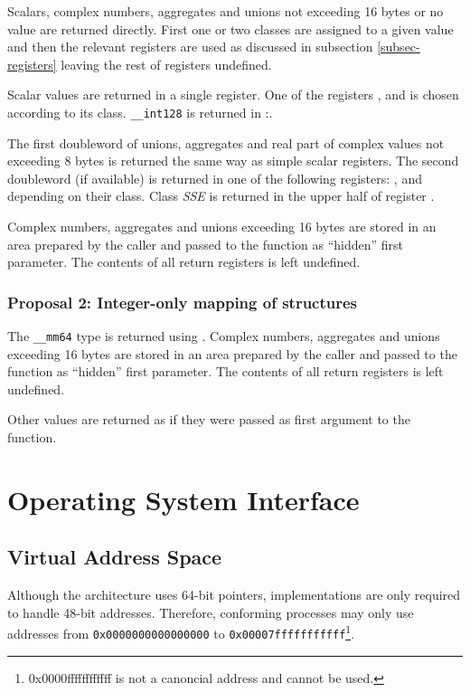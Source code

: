 Scalars, complex numbers, aggregates and unions not exceeding 16 bytes
or no value are returned directly.  First one or two classes are
assigned to a given value and then the relevant registers are used as
discussed in subsection \ref{subsec-registers} leaving the rest of
registers undefined.

Scalar values are returned in a single register. One of the registers
\RAX,  and  is chosen according to its class.
\verb|__int128| is returned in \RDX:\RAX.

The first doubleword of unions, aggregates and real part of complex
values not exceeding 8 bytes is returned the same way as simple scalar
registers.  The second doubleword (if available) is returned in one of
the following registers: \RAX,  and  depending on
their class.  Class \emph{SSE} is returned in the upper half of
register .

Complex numbers, aggregates and unions exceeding 16 bytes are stored
in an area prepared by the caller and passed to the function as
``hidden'' first parameter.  The contents of all return registers is
left undefined.

\subsubsection {Proposal 2: Integer-only mapping of structures}

The \verb|__mm64| type is returned using .  Complex numbers,
aggregates and unions exceeding 16 bytes are stored in an area
prepared by the caller and passed to the function as ``hidden'' first
parameter.  The contents of all return registers is left undefined.

Other values are returned as if they were passed as first argument to
the function.

\section{Operating System Interface}

\subsection{Virtual Address Space}

Although the \xARCH architecture uses 64-bit pointers, implementations
are only required to handle 48-bit addresses.  Therefore, conforming
processes may only use addresses from \texttt{0x0000000000000000} to
\texttt{0x00007fffffffffff}\footnote{0x0000ffffffffffff is not a
  canoncial address and cannot be used.}.

